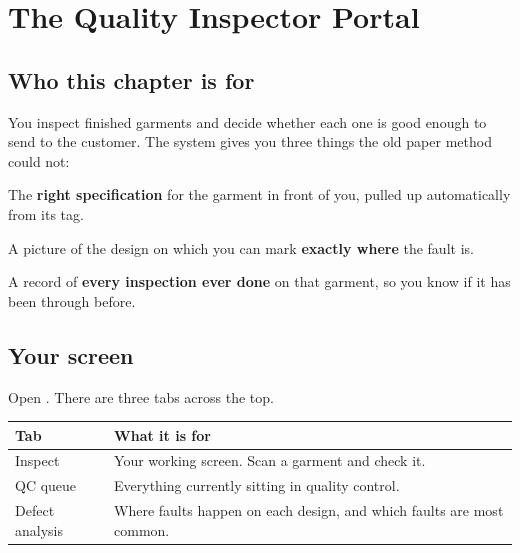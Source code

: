 \chapter{The Quality Inspector Portal}
\label{ch:qc}


\section{Who this chapter is for}

You inspect finished garments and decide whether each one is good enough to send
to the customer. The system gives you three things the old paper method could
not:

\begin{bullets}
  \item The \textbf{right specification} for the garment in front of you, pulled
        up automatically from its tag.
  \item A picture of the design on which you can mark \textbf{exactly where} the
        fault is.
  \item A record of \textbf{every inspection ever done} on that garment, so you
        know if it has been through before.
\end{bullets}

\section{Your screen}

Open . There are three tabs across the top.

\begin{table}[H]
\centering
\small
\begin{tabular}{@{}p{32mm}p{106mm}@{}}
\toprule
\textbf{Tab} & \textbf{What it is for} \\
\midrule
Inspect          & Your working screen. Scan a garment and check it. \\
QC queue         & Everything currently sitting in quality control. \\
Defect analysis  & Where faults happen on each design, and which faults are most common. \\
\bottomrule
\end{tabular}
\end{table}



